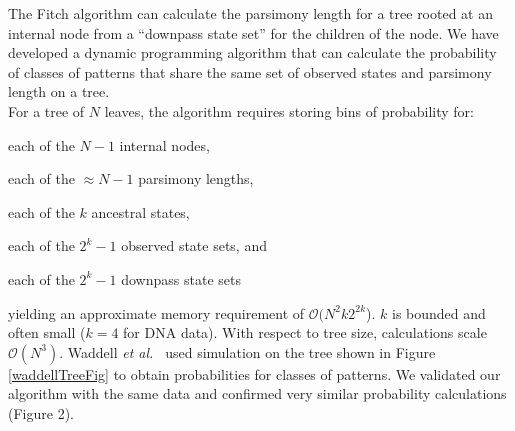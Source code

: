 \documentclass[a0paper,landscape]{baposter}
\begin{document}
\begin{poster}
{The Fitch algorithm can calculate the parsimony length for a tree rooted at an internal node from a ``downpass state set'' for the children of the node.
We have developed a dynamic programming algorithm that can calculate the probability of classes of patterns that share the same set of observed states and parsimony length on a tree.\\
For a tree of $N$ leaves, the algorithm requires storing bins of probability for:
\begin{compactitem}
	\item each of the $N-1$ internal nodes,
	\item each of the $\approx N - 1$ parsimony lengths,
	\item each of the $k$ ancestral states,
	\item  each of the $2^{k}-1$ observed state sets, and
	\item each of the $2^{k}-1$ downpass state sets
\end{compactitem}
yielding an approximate memory requirement of $\mathcal{O}(N^2 k 2^{2k}$).
$k$ is bounded and often small ($k=4$ for DNA data).
With respect to tree size, calculations scale $\mathcal{O}(N^3).$
Waddell {\em et al.~}\citep{WaddellOP2009} used simulation on the tree shown in Figure \ref{waddellTreeFig} to obtain probabilities for classes of patterns.
We validated our algorithm with the same data and confirmed very similar probability calculations (Figure 2).

}
\end{poster}
\end{document}
